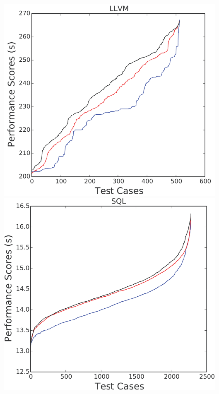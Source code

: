 \documentclass[conference]{IEEEtran}
\begin{document}
\begin{figure}[htbp!]
\begin{minipage}{0.30\linewidth}
\includegraphics[width=\linewidth]{_figs/LLVM.pdf}
\end{minipage}
\begin{minipage}{0.30\linewidth}
\includegraphics[width=\linewidth]{_figs/SQL.pdf}
\end{minipage}
\begin{minipage}{0.30\linewidth}

\end{minipage}
\end{figure}
\end{document}
